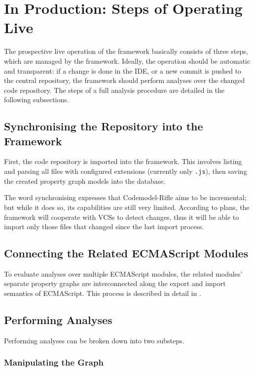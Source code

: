 \section{In Production: Steps of Operating Live}

The prospective live operation of the framework basically consists of three steps, which are managed by the framework. Ideally, the operation should be automatic and transparent: if a change is done in the IDE, or a new commit is pushed to the central repository, the framework should perform analyses over the changed code repository. The steps of a full analysis procedure are detailed in the following subsections.


\subsection{Synchronising the Repository into the Framework}

First, the code repository is imported into the framework. This involves listing and parsing all files with configured extensions (currently only \texttt{.js}), then saving the created property graph models into the database.

The word synchronising expresses that Codemodel-Rifle aims to be incremental; but while it does so, its capabilities are still very limited. According to plans, the framework will cooperate with VCSs to detect changes, thus it will be able to import only those files that changed since the last import process.


\subsection{Connecting the Related ECMAScript Modules}

To evaluate analyses over multiple ECMAScript modules, the related modules' separate property graphs are interconnected along the export and import semantics of ECMAScript. This process is described in detail in .


\subsection{Performing Analyses}

Performing analyses can be broken down into two substeps.


\subsubsection{Manipulating the Graph}


